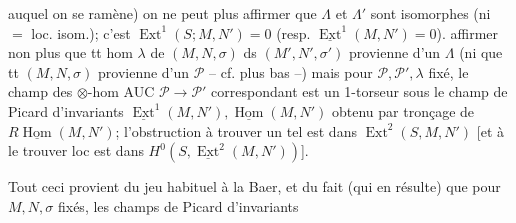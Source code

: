 auquel on se ramène) on ne peut plus affirmer que $\Lambda$ et $\Lambda'$ sont isomorphes  (ni $=$ loc. isom.); c'est    $\operatorname{Ext}^1(S;M,N')=0$ (resp. $\underline{\operatorname{Ext}}^1(M,N')=0$).  affirmer non plus que tt hom $\lambda$ de $(M,N,\sigma)$ ds $(M',N',\sigma')$ provienne d'un $\Lambda$  \inserted{[c'est OK ssi $\operatorname{Ext}^{\unsure{2|1}}(S;\unsure{M},N')=0$ resp. $\underline{\operatorname{Ext}}^2(M,N')=0$]} (ni que tt $(M,N,\sigma)$ provienne d'un $\mathscr P$ -- cf. plus bas --)
mais pour $\mathscr P,\mathscr P',\lambda$ fixé, le  champ des $\otimes$-hom AUC $\mathscr P\to\mathscr P'$ correspondant est un 1-torseur sous le champ de Picard  d'invariants $\underline{\operatorname{Ext}}^1(M,N'),\underline{\operatorname{Hom}}(M,N')$ obtenu par tronçage de $R\underline{\operatorname{Hom}}(M,N')$; l'obstruction à trouver un tel \inserted{$\Lambda$} est dans $\operatorname{Ext}^2(S,M,N')$ [et à le trouver loc est dans $H^0(S,\underline{\operatorname{Ext}}^2(M,N'))$].

Tout ceci provient du jeu habituel à la Baer, et du fait (qui en résulte) que pour $M,N,\sigma$  fixés, les champs de Picard d'invariants
